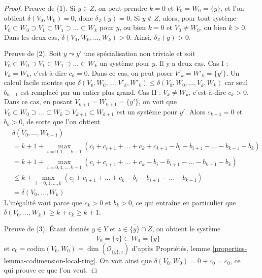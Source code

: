 \begin{proof}
Preuve de (1). Si $y \in Z$, on peut prendre $k = 0$ et
$V_0 = W_0 = \overline{\{y\}}$, et l'on obtient $\delta(V_0, W_0) = 0$, donc
$\delta_Z(y) = 0$. Si $y \not \in Z$, alors, pour tout système
$V_0 \subset W_0 \supset V_1 \subset W_1 \supset \ldots \subset W_k$
pour $y$, ou bien $k = 0$ et $V_0 \not = W_0$, ou bien $k > 0$.
Dans les deux cas, $\delta(V_0, W_0, \ldots, W_k) > 0$. Ainsi, $\delta_Z(y) > 0$.

\medskip\noindent
Preuve de (2). Soit $y \leadsto y'$ une spécialisation non triviale et soit
$V_0 \subset W_0 \supset V_1 \subset W_1 \supset \ldots \subset W_k$
un système pour $y$. Il y a deux cas.
Cas I : $V_k = W_k$, c'est-à-dire $c_k = 0$. Dans ce cas,
on peut poser $V'_k = W'_k = \overline{\{y'\}}$.
Un calcul facile montre que
$\delta(V_0, W_0, \ldots, V'_k, W'_k) \leq
\delta(V_0, W_0, \ldots, V_k, W_k)$
car seul $b_{k - 1}$ est remplacé par un entier plus grand.
Cas II : $V_k \not = W_k$, c'est-à-dire $c_k > 0$.
Dans ce cas, en posant $V_{k + 1} = W_{k + 1} = \overline{\{y'\}}$,
on voit que $V_0 \subset W_0 \supset \ldots \subset W_k \supset V_{k + 1}
\subset W_{k + 1}$ est un système pour $y'$. Alors $c_{k + 1} = 0$ et
$b_k > 0$, de sorte que l'on obtient
\begin{align*}
& \delta(V_0, \ldots, W_{k + 1}) \\
& =
k + 1 +
\max_{i = 0, 1, \ldots, k + 1}
(c_i + c_{i + 1} + \ldots + c_k + c_{k + 1}
- b_i - b_{i + 1} - \ldots - b_{k - 1} - b_k) \\
& =
k + 1 +
\max_{i = 0, 1, \ldots, k + 1}
(c_i + c_{i + 1} + \ldots + c_k
- b_i - b_{i + 1} - \ldots - b_{k - 1} - b_k) \\
& \leq
k + \max_{i = 0, 1, \ldots, k}
(c_i + c_{i + 1} + \ldots + c_k - b_i - b_{i + 1} - \ldots - b_{k - 1}) \\
& = \delta(V_0, \ldots, W_k)
\end{align*}
L'inégalité vaut parce que $c_k > 0$ et $b_k > 0$, ce qui entraîne en particulier
que $\delta(V_0, \ldots, W_k) \geq k + c_k \geq k + 1$.

\medskip\noindent
Preuve de (3). Étant donnés $y \in Y$ et $z \in \overline{\{y\}} \cap Z$,
on obtient le système
$$
V_0 = \overline{\{z\}} \subset W_0 = \overline{\{y\}}
$$
et $c_0 = \text{codim}(V_0, W_0) = \dim(\mathcal{O}_{\overline{\{y\}}, z})$
d'après Propriétés, lemme \ref{properties-lemma-codimension-local-ring}.
On voit ainsi que $\delta(V_0, W_0) = 0 + c_0 = c_0$, ce qui prouve
ce que l'on veut.


\end{proof}
